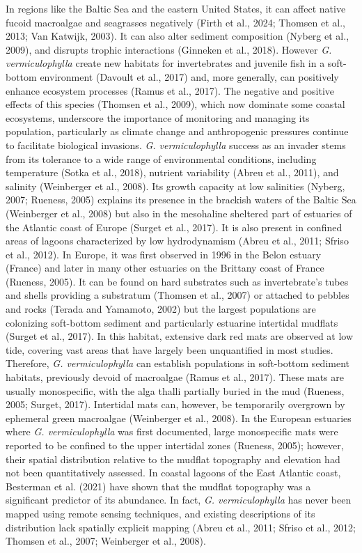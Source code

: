 \documentclass[
  letterpaper,
  11pt,
  english,
  singlespacing,
  headsepline]{MastersDoctoralThesis}
\begin{document}
\begin{spacing}{1.5}
In regions like the Baltic Sea and the eastern United States, it can
affect native fucoid macroalgae and seagrasses negatively (Firth et al.,
2024; Thomsen et al., 2013; Van Katwijk, 2003). It can also alter
sediment composition (Nyberg et al., 2009), and disrupts trophic
interactions (Ginneken et al., 2018). However \emph{G. vermiculophylla}
create new habitats for invertebrates and juvenile fish in a soft-bottom
environment (Davoult et al., 2017) and, more generally, can positively
enhance ecosystem processes (Ramus et al., 2017). The negative and
positive effects of this species (Thomsen et al., 2009), which now
dominate some coastal ecosystems, underscore the importance of
monitoring and managing its population, particularly as climate change
and anthropogenic pressures continue to facilitate biological invasions.
\emph{G. vermiculophylla} success as an invader stems from its tolerance
to a wide range of environmental conditions, including temperature
(Sotka et al., 2018), nutrient variability (Abreu et al., 2011), and
salinity (Weinberger et al., 2008). Its growth capacity at low
salinities (Nyberg, 2007; Rueness, 2005) explains its presence in the
brackish waters of the Baltic Sea (Weinberger et al., 2008) but also in
the mesohaline sheltered part of estuaries of the Atlantic coast of
Europe (Surget et al., 2017). It is also present in confined areas of
lagoons characterized by low hydrodynamism (Abreu et al., 2011; Sfriso
et al., 2012). In Europe, it was first observed in 1996 in the Belon
estuary (France) and later in many other estuaries on the Brittany coast
of France (Rueness, 2005). It can be found on hard substrates such as
invertebrate's tubes and shells providing a substratum (Thomsen et al.,
2007) or attached to pebbles and rocks (Terada and Yamamoto, 2002) but
the largest populations are colonizing soft-bottom sediment and
particularly estuarine intertidal mudflats (Surget et al., 2017). In
this habitat, extensive dark red mats are observed at low tide, covering
vast areas that have largely been unquantified in most studies.
Therefore, \emph{G. vermiculophylla} can establish populations in
soft-bottom sediment habitats, previously devoid of macroalgae (Ramus et
al., 2017). These mats are usually monospecific, with the alga thalli
partially buried in the mud (Rueness, 2005; Surget, 2017). Intertidal
mats can, however, be temporarily overgrown by ephemeral green
macroalgae (Weinberger et al., 2008). In the European estuaries where
\emph{G. vermiculophylla} was first documented, large monospecific mats
were reported to be confined to the upper intertidal zones (Rueness,
2005); however, their spatial distribution relative to the mudflat
topography and elevation had not been quantitatively assessed. In
coastal lagoons of the East Atlantic coast, Besterman et al. (2021) have
shown that the mudflat topography was a significant predictor of its
abundance. In fact, \emph{G. vermiculophylla} has never been mapped
using remote sensing techniques, and existing descriptions of its
distribution lack spatially explicit mapping (Abreu et al., 2011; Sfriso
et al., 2012; Thomsen et al., 2007; Weinberger et al., 2008).


\end{spacing}
\end{document}
